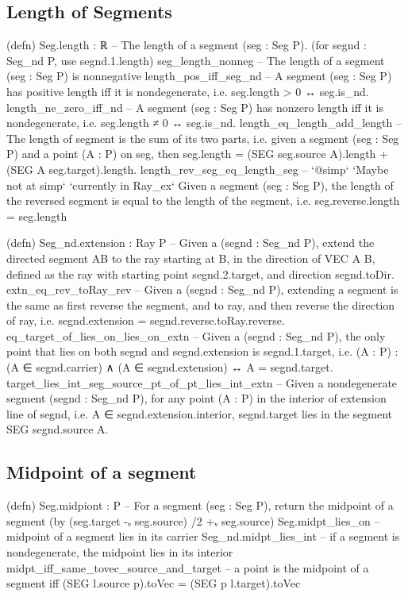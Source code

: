 \documentclass[12pt,a4paper]{article}
\begin{document}
\subsection{Length of Segments}

    (defn) Seg.length : ℝ -- The length of a segment (seg : Seg P).  (for segnd : Seg_nd P, use segnd.1.length)
    seg_length_nonneg -- The length of a segment (seg : Seg P) is nonnegative
    length_pos_iff_seg_nd -- A segment (seg : Seg P) has positive length iff it is nondegenerate, i.e. seg.length > 0 ↔ seg.is_nd.
    length_ne_zero_iff_nd -- A segment (seg : Seg P) has nonzero length iff it is nondegenerate, i.e. seg.length ≠ 0 ↔ seg.is_nd.
    length_eq_length_add_length -- The length of segment is the sum of its two parts, i.e. given a segment (seg : Seg P) and a point (A : P) on seg, then seg.length = (SEG seg.source A).length + (SEG A seg.target).length.
    length_rev_seg_eq_length_seg -- `@simp` `Maybe not at simp` `currently in Ray_ex` Given a segment (seg : Seg P), the length of the reversed segment is equal to the length of the segment, i.e. seg.reverse.length = seg.length

    (defn) Seg_nd.extension : Ray P -- Given a (segnd : Seg_nd P), extend the directed segment AB to the ray starting at B, in the direction of VEC A B, defined as the ray with starting point segnd.2.target, and direction segnd.toDir.
    extn_eq_rev_toRay_rev -- Given a (segnd : Seg_nd P), extending a segment is the same as first reverse the segment, and to ray, and then reverse the direction of ray, i.e. segnd.extension = segnd.reverse.toRay.reverse.
    eq_target_of_lies_on_lies_on_extn -- Given a (segnd : Seg_nd P), the only point that lies on both segnd and segnd.extension is segnd.1.target, i.e. (A : P) : (A ∈ segnd.carrier) ∧ (A ∈ segnd.extension) ↔ A = segnd.target.
    target_lies_int_seg_source_pt_of_pt_lies_int_extn -- Given a nondegenerate segment (segnd : Seg_nd P), for any point (A : P) in the interior of extension line of segnd, i.e. A ∈ segnd.extension.interior, segnd.target lies in the segment SEG segnd.source A.


\subsection{Midpoint of a segment}

    (defn) Seg.midpiont : P -- For a segment (seg : Seg P), return the midpoint of a segment (by (seg.target -ᵥ seg.source) /2 +ᵥ seg.source)
    Seg.midpt_lies_on -- midpoint of a segment lies in its carrier
    Seg_nd.midpt_lies_int -- if a segment is nondegenerate, the midpoint lies in its interior
    midpt_iff_same_tovec_source_and_target -- a point is the midpoint of a segment iff (SEG l.source p).toVec = (SEG p l.target).toVec
    
\end{document}
